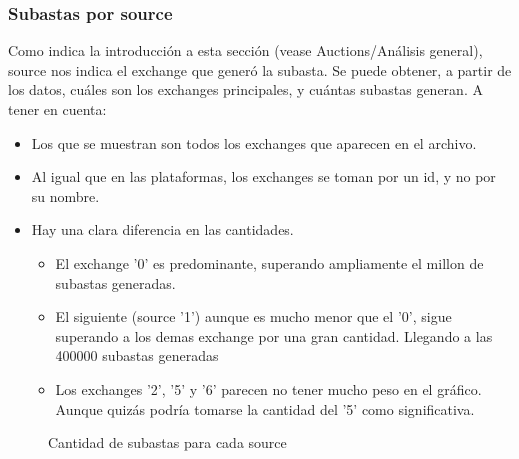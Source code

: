 \documentclass{article}
\newcommand\tab[1][1cm]{\hspace*{#1}}
\begin{document}
	\subsubsection{Subastas por source}
	\tab Como indica la introducción a esta sección (vease Auctions/Análisis general), source nos indica el exchange que generó la subasta. Se puede obtener, a partir de los datos, cuáles son los exchanges principales, y cuántas subastas generan.
	\tab A tener en cuenta:
	\begin{itemize}
		\item Los que se muestran son todos los exchanges que aparecen en el archivo.
		\item Al igual que en las plataformas, los exchanges se toman por un id, y no por su nombre.
		\item Hay una clara diferencia en las cantidades.
		\begin{itemize}
			\item El exchange '0' es predominante, superando ampliamente el millon de subastas generadas.
			\item El siguiente (source '1') aunque es mucho menor que el '0', sigue superando a los demas exchange por una gran cantidad. Llegando a las 400000 subastas generadas
			\item Los exchanges '2', '5' y '6' parecen no tener mucho peso en el gráfico. Aunque quizás podría tomarse la cantidad del '5' como significativa.
		\end{itemize}  
	\end{itemize}
	
	\FloatBarrier
		\begin{figure}
			\centering
		   	\caption{Cantidad de subastas para cada source}
			\label{subastassource}
		\end{figure}
	\FloatBarrier	
	
\end{document}
